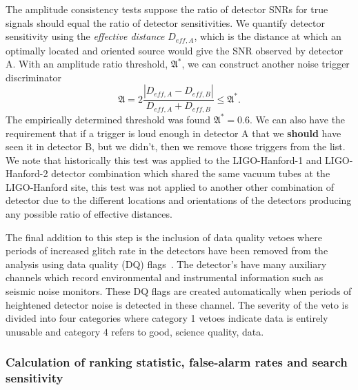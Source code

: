 %
The amplitude consistency tests suppose the ratio of detector SNRs for true \gwadj signals should equal the ratio of detector sensitivities. We quantify detector sensitivity using the \textit{effective distance} $D_{eff, A}$, which is the distance at which an optimally located and oriented source would give the SNR observed by detector A. With an amplitude ratio threshold, $\mathfrak{A}^{*}$, we can construct another noise trigger discriminator
%
\begin{equation}
    \mathfrak{A} = 2 \frac{|D_{eff, A} - D_{eff, B}|}{D_{eff, A} + D_{eff, B}} \le \mathfrak{A}^{*}.
\end{equation}
%
The empirically determined threshold was found $\mathfrak{A}^{*} = 0.6$. We can also have the requirement that if a trigger is loud enough in detector A that we \textbf{should} have seen it in detector B, but we didn't, then we remove those triggers from the list. We note that historically this test was applied to the LIGO-Hanford-1 and LIGO-Hanford-2 detector combination which shared the same vacuum tubes at the LIGO-Hanford site, this test was not applied to another other combination of detector due to the different locations and orientations of the detectors producing any possible ratio of effective distances.

The final addition to this step is the inclusion of data quality vetoes where periods of increased glitch rate in the detectors have been removed from the analysis using data quality (DQ) flags~\cite{Slutsky:2010}. The detector's have many auxiliary channels which record environmental and instrumental information such as seismic noise monitors. These DQ flags are created automatically when periods of heightened detector noise is detected in these channel. The severity of the veto is divided into four categories where category 1 vetoes indicate data is entirely unusable and category 4 refers to good, science quality, data.

\subsubsection{Calculation of ranking statistic, false-alarm rates and search sensitivity}

